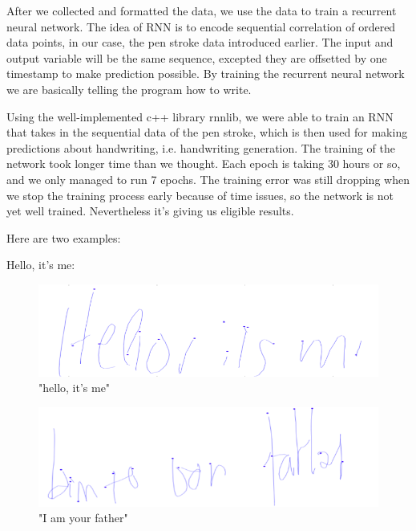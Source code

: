 \documentclass{article} %
\newcommand{\flabel}[1]{\label{fig:#1}}
\begin{document}
After we collected and formatted the data, we use the data to train a recurrent neural network. The idea of RNN is to encode sequential correlation of ordered data points, in our case, the pen stroke data introduced earlier. The input and output variable will be the same sequence, excepted they are offsetted by one timestamp to make prediction possible. By training the recurrent neural network we are basically telling the program how to write. 

Using the well-implemented c++ library rnnlib, we were able to train an RNN that takes in the sequential data of the pen stroke, which is then used for making predictions about handwriting, i.e. handwriting generation. The training of the network took longer time than we thought. Each epoch is taking 30 hours or so, and we only managed to run 7 epochs. The training error was still dropping when we stop the training process early because of time issues, so the network is not yet well trained. Nevertheless it’s giving us eligible results. 

Here are two examples: 

Hello, it’s me: 
\begin{figure}
\begin{center}
\includegraphics[scale = 0.5]{hello.png}
\end{center}
\flabel{hello}
\caption{"hello, it's me"}
\end{figure}

\begin{figure}
\begin{center}
\includegraphics[scale = 0.5]{father.png}
\end{center}
\flabel{father}
\caption{"I am your father"}
\end{figure}
\end{document}

